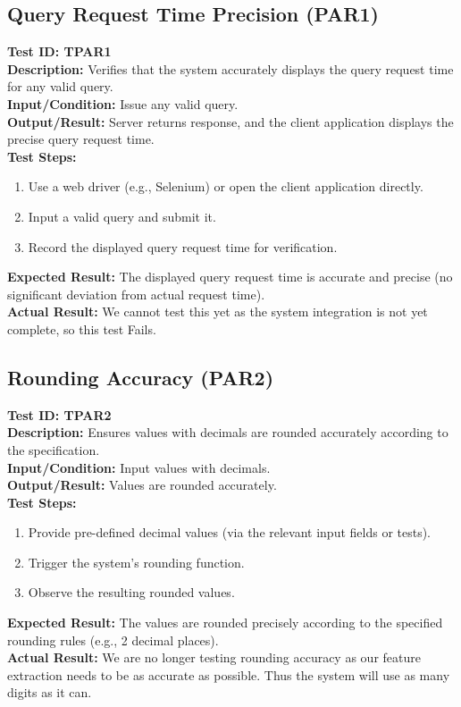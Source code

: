 \documentclass[12pt, titlepage]{article}
\begin{document}
\subsection{Query Request Time Precision (PAR1)}
\textbf{Test ID: TPAR1}\\
\textbf{Description:} Verifies that the system accurately displays the query request time for any valid query.\\
\textbf{Input/Condition:} Issue any valid query.\\
\textbf{Output/Result:} Server returns response, and the client application displays the precise query request time.\\
\textbf{Test Steps:}
\begin{enumerate}
    \item Use a web driver (e.g., Selenium) or open the client application directly.
    \item Input a valid query and submit it.
    \item Record the displayed query request time for verification.
\end{enumerate}
\textbf{Expected Result:} The displayed query request time is accurate and precise (no significant deviation from actual request time).\\
\textbf{Actual Result:} We cannot test this yet as the system integration is not yet complete, so this test Fails.

\subsection{Rounding Accuracy (PAR2)}
\textbf{Test ID: TPAR2}\\
\textbf{Description:} Ensures values with decimals are rounded accurately according to the specification.\\
\textbf{Input/Condition:} Input values with decimals.\\
\textbf{Output/Result:} Values are rounded accurately.\\
\textbf{Test Steps:}
\begin{enumerate}
    \item Provide pre-defined decimal values (via the relevant input fields or tests).
    \item Trigger the system's rounding function.
    \item Observe the resulting rounded values.
\end{enumerate}
\textbf{Expected Result:} The values are rounded precisely according to the specified rounding rules (e.g., 2 decimal places).\\
\textbf{Actual Result:} We are no longer testing rounding accuracy as our feature extraction needs to be as accurate as possible. Thus the system will use as many digits as it can.
\end{document}
